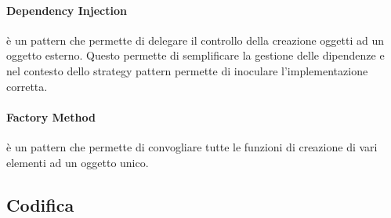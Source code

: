 \paragraph{Dependency Injection} è un pattern che permette di delegare il controllo della creazione oggetti ad un oggetto esterno. Questo permette di semplificare la gestione delle dipendenze e nel contesto dello strategy pattern permette di inoculare l’implementazione corretta. 
\paragraph{Factory Method} è un pattern che permette di convogliare tutte le funzioni di creazione di vari elementi ad un oggetto unico. 

\subsection{Codifica}


